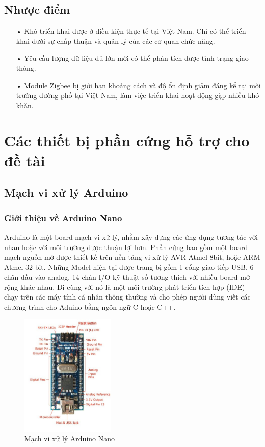 \subsection{Nhược điểm}
\begin{itemize}
	\item[•] Khó triển khai được ở điều kiện thực tế tại Việt Nam. Chỉ có thể triển khai dưới sự chấp thuận và quản lý của các cơ quan chức năng.
	\item[•] Yêu cầu lượng dữ liệu đủ lớn mới có thể phân tích được tình trạng giao thông.
	\item[•] Module Zigbee bị giới hạn khoảng cách và độ ổn định giảm đáng kể tại môi trường đường phố tại Việt Nam, làm việc triển khai hoạt động gặp nhiều khó khăn.
\end{itemize}
\section{Các thiết bị phần cứng hỗ trợ cho đề tài}
\subsection{Mạch vi xử lý Arduino}
\subsubsection*{Giới thiệu về Arduino Nano}
Arduino là một board mạch vi xử lý, nhằm xây dựng các ứng dụng tương tác với nhau hoặc với môi trường được thuận lợi hơn. Phần cứng bao gồm một board mạch nguồn mở được thiết kế trên nền tảng vi xử lý AVR Atmel 8bit, hoặc ARM Atmel 32-bit. Những Model hiện tại được trang bị gồm 1 cổng giao tiếp USB, 6 chân đầu vào analog, 14 chân I/O kỹ thuật số tương thích với nhiều board mở rộng khác nhau. Đi cùng với nó là một môi trường phát triển tích hợp (IDE) chạy trên các máy tính cá nhân thông thường và cho phép người dùng viết các chương trình cho Aduino bằng ngôn ngữ C hoặc C++.

\begin{figure}[H]
	\centering    
	\includegraphics[width=0.4\textwidth]{arduinonano}
	\caption[Mạch vi xử lý Arduino Nano]{Mạch vi xử lý Arduino Nano}
	\label{fig:arduinonano}
\end{figure}

